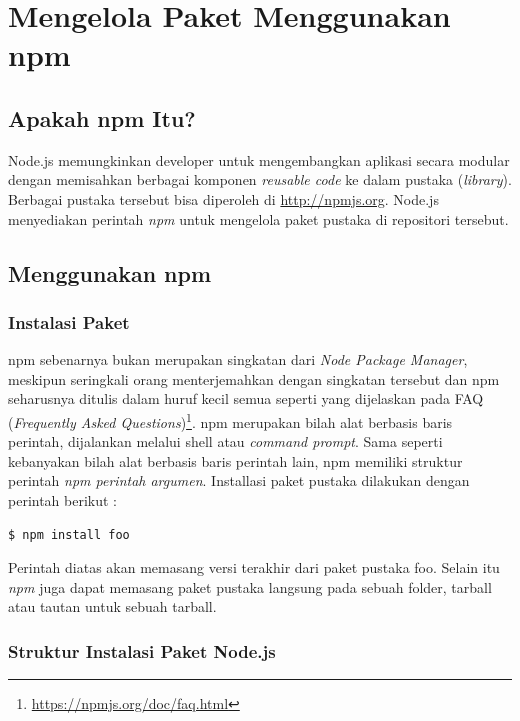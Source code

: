 \chapter{Mengelola Paket Menggunakan npm}

\section{Apakah npm Itu?}

Node.js memungkinkan developer untuk mengembangkan aplikasi secara modular dengan memisahkan berbagai komponen \textit{reusable code} ke dalam pustaka (\textit{library}). Berbagai pustaka tersebut bisa diperoleh di \url{http://npmjs.org}. Node.js menyediakan perintah \textit{npm} untuk mengelola paket pustaka di repositori tersebut.

\section{Menggunakan npm}

\subsection{Instalasi Paket}

npm sebenarnya bukan merupakan singkatan dari \textit{Node Package Manager}, meskipun seringkali orang menterjemahkan dengan singkatan tersebut dan npm seharusnya ditulis dalam huruf kecil semua seperti yang dijelaskan pada FAQ (\textit{Frequently Asked Questions})\footnote{\url{https://npmjs.org/doc/faq.html}}. npm merupakan bilah alat berbasis baris perintah, dijalankan melalui shell atau \textit{command prompt}. Sama seperti kebanyakan bilah alat berbasis baris perintah lain, npm memiliki struktur perintah \textit{npm perintah argumen}. Installasi paket pustaka dilakukan dengan perintah berikut :

\lstset{language=bash,caption=Cara install paket menggunakan npm}
\begin{lstlisting}
$ npm install foo
\end{lstlisting}

Perintah diatas akan memasang versi terakhir dari paket pustaka foo. Selain itu \textit{npm} juga dapat memasang paket pustaka langsung pada sebuah folder, tarball atau tautan untuk sebuah tarball.

\subsection{Struktur Instalasi Paket Node.js}

